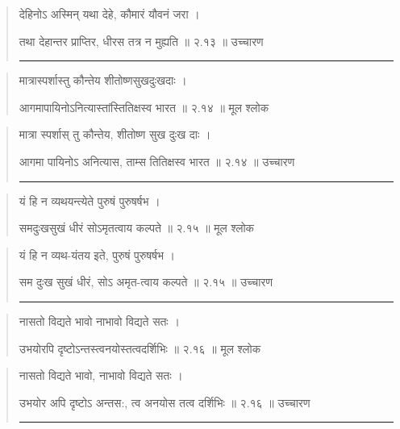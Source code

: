 \begin{quotation}

देहिनोऽ अस्मिन् यथा देहे, कौमारं यौवनं जरा  ।  

तथा देहान्तर प्राप्तिर, धीरस तत्र न मुह्यति  ॥ २.१३ ॥  उच्चारण

\noindent\rule{16cm}{0.4pt} 
\end{quotation}


\begin{quotation}

मात्रास्पर्शास्तु कौन्तेय शीतोष्णसुखदुःखदाः  ।  

आगमापायिनोऽनित्यास्तांस्तितिक्षस्व भारत  ॥ २.१४ ॥  मूल श्लोक
\end{quotation}

\begin{quotation}

मात्रा स्पर्शास् तु कौन्तेय, शीतोष्ण सुख दुःख दाः  ।  

आगमा पायिनोऽ अनित्यास, ताम्स तितिक्षस्व भारत  ॥ २.१४ ॥  उच्चारण

\noindent\rule{16cm}{0.4pt} 
\end{quotation}


\begin{quotation}

यं हि न व्यथयन्त्येते पुरुषं पुरुषर्षभ  ।  

समदुःखसुखं धीरं सोऽमृतत्वाय कल्पते  ॥ २.१५ ॥  मूल श्लोक
\end{quotation}

\begin{quotation}

यं हि न व्यथ-यंतय इते, पुरुषं पुरुषर्षभ  ।  

सम दुःख सुखं धीरं, सोऽ अमृत-त्वाय कल्पते  ॥ २.१५ ॥  उच्चारण

\noindent\rule{16cm}{0.4pt} 
\end{quotation}


\begin{quotation}

नासतो विद्यते भावो नाभावो विद्यते सतः  ।  

उभयोरपि दृष्टोऽन्तस्त्वनयोस्तत्वदर्शिभिः  ॥ २.१६ ॥  मूल श्लोक
\end{quotation}

\begin{quotation}

नासतो विद्यते भावो, नाभावो विद्यते सतः  ।  

उभयोर अपि दृष्टोऽ अन्तस:, त्व अनयोस तत्व दर्शिभिः  ॥ २.१६ ॥  उच्चारण

\noindent\rule{16cm}{0.4pt} 
\end{quotation}


